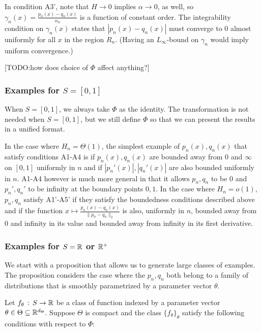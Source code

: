 \documentclass{article}
\begin{document}
In condition A3', note that $H \rightarrow 0$ implies $\alpha \rightarrow 0$, as well, so $\gamma_n(x) = \frac{p_n(x) - q_n(x)}{\alpha_n}$ is a function of constant order. The integrability condition on $\gamma_n(x)$ states that $|p_n(x) - q_n(x)|$ must converge to 0 almost uniformly for all $x$ in the region $R_n$. (Having an $L_\infty$-bound on $\gamma_n$ would imply uniform convergence.) 

[TODO:how does choice of $\Phi$ affect anything?]



\subsubsection{Examples for $S = [0,1]$}
\label{sec:examples_bounded_support}

When $S=[0,1]$, we always take $\Phi$ as the identity. The transformation is not needed when $S=[0,1]$, but we still define $\Phi$ so that we can present the results in a unified format.

In the case where $H_n = \Theta(1)$, the simplest example of $p_n(x), q_n(x)$ that satisfy conditions A1-A4 is if $p_n(x), q_n(x)$ are bounded away from 0 and $\infty$ on $[0,1]$ uniformly in $n$ and if $|p_n'(x)|, |q_n'(x)|$ are also bounded uniformly in $n$. A1-A4 however is much more general in that it allows $p_n, q_n$ to be 0 and $p_n', q_n'$ to be infinity at the boundary points $0, 1$. In the case where $H_n = o(1)$, $p_n, q_n$ satisfy A1'-A5' if they satisfy the boundedness conditions described above and if the function $x \mapsto \frac{p_n(x) - q_n(x)}{\| p_n - q_n\|_2}$ is also, uniformly in $n$, bounded away from 0 and infinity in its value and bounded away from infinity in its first derivative.

\subsubsection{Examples for $S = {\mathbb R}$ or ${\mathbb R}^+$}  
\label{sec:examples_unbounded_support}

We start with a proposition that allows us to generate large classes of examples. The proposition considers the case where the $p_n, q_n$ both belong to a family of distributions that is smoothly parametrized by a parameter vector $\theta$.

Let $f_\theta \,:\, S \rightarrow {\mathbb R}$ be a class of function indexed by a parameter vector $\theta \in \Theta \subseteq {\mathbb R}^{d_{\Theta}}$. Suppose $\Theta$ is compact and the class $\{ f_{\theta} \}_{\theta}$ satisfy the following conditions with respect to $\Phi$:
\end{document}
